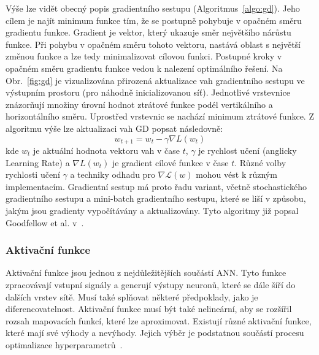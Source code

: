 Výše lze vidět obecný popis gradientního sestupu (Algoritmus~\ref{algo:gd}).
Jeho cílem je najít minimum funkce tím, že se postupně pohybuje v opačném směru
gradientu funkce. Gradient je vektor, který ukazuje směr největšího nárůstu
funkce. Při pohybu v opačném směru tohoto vektoru, nastává oblast s největší
změnou funkce a lze tedy minimalizovat cílovou funkci. Postupné kroky v opačném
směru gradientu funkce vedou k nalezení optimálního řešení. Na Obr.~\ref{fig:gd}
je vizualizována přirozená aktualizace vah gradientního sestupu ve výstupním
prostoru (pro náhodně inicializovanou síť). Jednotlivé vrstevnice znázorňují
množiny úrovní hodnot ztrátové funkce podél vertikálního a horizontálního směru.
Uprostřed vrstevnic se nachází minimum ztrátové funkce. Z algoritmu výše lze
aktualizaci vah GD popsat následovně:
\begin{equation}
    w_{t+1} = w_t - \gamma \nabla L(w_t)
\end{equation}
kde $w_t$ je aktuální hodnota vektoru vah v čase $t$, $\gamma$ je rychlost učení
(anglicky Learning Rate) a $\nabla L(w_t)$ je gradient cílové funkce v čase $t$.
Různé volby rychlosti učení $\gamma$ a techniky odhadu pro
$\nabla\mathcal{L}(w)$ mohou vést k různým implementacím. Gradientní sestup má
proto řadu variant, včetně stochastického gradientního sestupu a mini-batch
gradientního sestupu, které se liší v způsobu, jakým jsou gradienty vypočítávány
a aktualizovány. Tyto algoritmy již popsal Goodfellow et al.
v~\cite{Goodfellow2016}.

\subsubsection{Aktivační funkce}
Aktivační funkce jsou jednou z nejdůležitějších součástí \gls{ANN}. Tyto funkce
zpracovávají vstupní signály a generují výstupy neuronů, které se dále šíří do
dalších vrstev sítě. Musí také splňovat některé předpoklady, jako je
diferencovatelnost. Aktivační funkce musí být také nelineární, aby se rozšířil
rozsah mapovacích funkcí, které lze aproximovat. Existují různé aktivační
funkce, které mají své výhody a nevýhody. Jejich výběr je podstatnou součástí
procesu optimalizace hyperparametrů~\cite{sharma2017,Goodfellow2016}.

